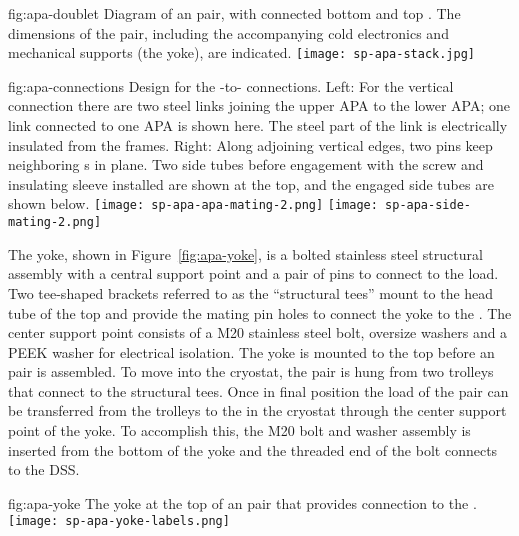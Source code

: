\begin{dunefigure}{fig:apa-doublet}
{Diagram of an  pair, with connected bottom and top . The dimensions of the  pair, including the accompanying cold electronics and mechanical supports (the yoke), are indicated.}
\texttt{[image: sp-apa-stack.jpg]} 
\end{dunefigure}

\begin{dunefigure}{fig:apa-connections}
{Design for the -to- connections.  Left: For the vertical connection there are two steel links joining the upper APA to the lower APA; one link connected to one APA is shown here.  The steel part of the link is electrically insulated from the frames.  Right: Along adjoining vertical edges, two pins keep neighboring s in plane. Two side tubes before engagement with the screw and insulating sleeve installed are shown at the top, and the engaged side tubes are shown below.}  
\texttt{[image: sp-apa-apa-mating-2.png]} \qquad
\texttt{[image: sp-apa-side-mating-2.png]}
\end{dunefigure}

The  yoke, shown in Figure~\ref{fig:apa-yoke}, is a bolted stainless steel structural assembly with a central support point and a pair of pins to connect to the load.  Two tee-shaped brackets referred to as the ``structural tees'' mount to the head tube of the top  and provide the mating pin holes to connect the yoke to the .  The center support point consists of a M20 stainless steel bolt, oversize washers and a PEEK washer for electrical isolation.   The yoke is mounted to the top  before an  pair %
is assembled.  To move into the cryostat, the pair %
is hung from two trolleys that connect to the structural tees. Once in final position the load of the  pair %
can be transferred from the trolleys to the  in the cryostat through the center support point of the yoke.  To accomplish this, the M20 bolt and washer assembly is inserted from the bottom of the yoke and the threaded end of the bolt connects to the DSS.

\begin{dunefigure}{fig:apa-yoke} %
{The yoke at the top of an  pair %
that provides connection to the .}
\texttt{[image: sp-apa-yoke-labels.png]} 
\end{dunefigure}

